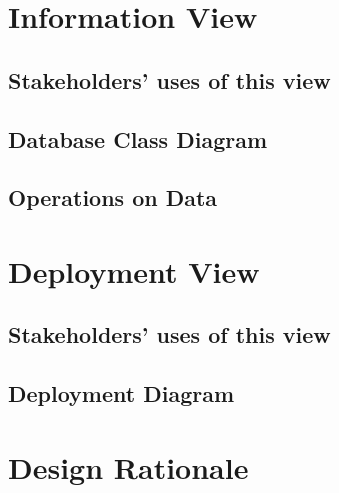 \section{Information View}

\subsection{Stakeholders' uses of this view}

\subsection{Database Class Diagram}

\subsection{Operations on Data}

\section{Deployment View}

\subsection{Stakeholders' uses of this view}

\subsection{Deployment Diagram}

\section{Design Rationale}
